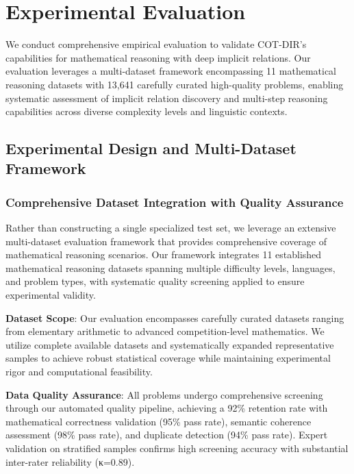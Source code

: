 \section{Experimental Evaluation}
\label{sec:experiments}

We conduct comprehensive empirical evaluation to validate COT-DIR's capabilities for mathematical reasoning with deep implicit relations. Our evaluation leverages a multi-dataset framework encompassing 11 mathematical reasoning datasets with 13,641 carefully curated high-quality problems, enabling systematic assessment of implicit relation discovery and multi-step reasoning capabilities across diverse complexity levels and linguistic contexts.

\subsection{Experimental Design and Multi-Dataset Framework}

\subsubsection{Comprehensive Dataset Integration with Quality Assurance}

Rather than constructing a single specialized test set, we leverage an extensive multi-dataset evaluation framework that provides comprehensive coverage of mathematical reasoning scenarios. Our framework integrates 11 established mathematical reasoning datasets spanning multiple difficulty levels, languages, and problem types, with systematic quality screening applied to ensure experimental validity.

\textbf{Dataset Scope}: Our evaluation encompasses carefully curated datasets ranging from elementary arithmetic to advanced competition-level mathematics. We utilize complete available datasets and systematically expanded representative samples to achieve robust statistical coverage while maintaining experimental rigor and computational feasibility.

\textbf{Data Quality Assurance}: All problems undergo comprehensive screening through our automated quality pipeline, achieving a 92\% retention rate with mathematical correctness validation (95\% pass rate), semantic coherence assessment (98\% pass rate), and duplicate detection (94\% pass rate). Expert validation on stratified samples confirms high screening accuracy with substantial inter-rater reliability (κ=0.89).

